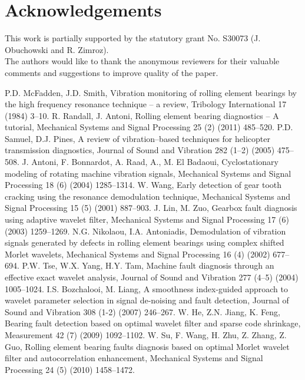 \documentclass[3p,times]{elsarticle}
\begin{document}
\section{Acknowledgements}
This work is partially supported by the statutory grant No. S30073 (J. Obuchowski and R. Zimroz).\\
The authors would like to thank the anonymous reviewers for their valuable comments and suggestions to improve quality of the paper.

\begin{thebibliography}{00}
 P.D. McFadden, J.D. Smith, Vibration monitoring of rolling element bearings by the high frequency resonance technique -- a review, Tribology International 17 (1984) 3--10.
 R. Randall, J. Antoni, Rolling element bearing diagnostics -- A tutorial, Mechanical Systems and Signal Processing 25 (2) (2011) 485--520.
 P.D. Samuel, D.J. Pines, A review of vibration--based techniques for helicopter transmission diagnostics, Journal of Sound and Vibration 282 (1--2) (2005) 475--508.
 J. Antoni, F. Bonnardot, A. Raad, A., M. El Badaoui, Cyclostationary modeling of rotating machine vibration signals, Mechanical Systems and Signal Processing 18 (6) (2004) 1285--1314.
 W. Wang, Early detection of gear tooth cracking using the resonance demodulation technique, Mechanical Systems and Signal Processing  15 (5) (2001) 887--903.
 J. Lin, M. Zuo, Gearbox fault diagnosis using adaptive wavelet filter, Mechanical Systems and Signal Processing 17 (6) (2003) 1259--1269.
	N.G. Nikolaou, I.A. Antoniadis, Demodulation of vibration signals generated by defects in rolling element bearings using complex shifted Morlet wavelets, Mechanical Systems and Signal Processing 16 (4) (2002) 677--694.
	P.W. Tse, W.X. Yang, H.Y. Tam, Machine fault diagnosis through an effective exact wavelet analysis, Journal of Sound and Vibration 277 (4--5) (2004) 1005--1024.
 I.S. Bozchalooi, M. Liang, A smoothness index-guided approach to wavelet parameter selection in signal de-noising and fault detection, Journal of Sound and Vibration 308 (1-2) (2007) 246--267.
 W. He, Z.N. Jiang, K. Feng, Bearing fault detection based on optimal wavelet filter and sparse code shrinkage, Measurement 42 (7) (2009) 1092--1102.
 W. Su, F. Wang, H. Zhu, Z. Zhang, Z. Guo, Rolling element bearing faults diagnosis based on optimal Morlet wavelet filter and autocorrelation enhancement, Mechanical Systems and Signal Processing 24 (5) (2010) 1458--1472.

\end{thebibliography}
\end{document}
